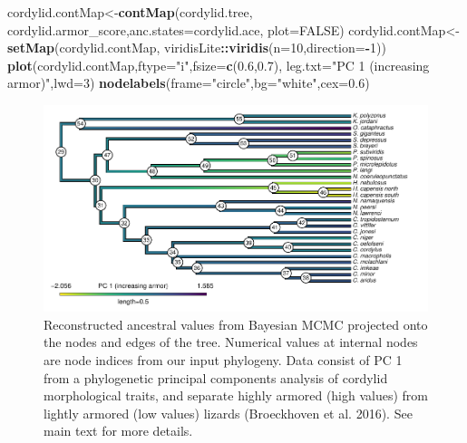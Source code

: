 \documentclass[fleqn,10pt,lineno]{wlpeerj} %
\newenvironment{Shaded}{\begin{snugshade}}{\end{snugshade}}
\newcommand{\AttributeTok}[1]{\textcolor[rgb]{0.13,0.29,0.53}{#1}}
\newcommand{\ConstantTok}[1]{\textcolor[rgb]{0.56,0.35,0.01}{#1}}
\newcommand{\DecValTok}[1]{\textcolor[rgb]{0.00,0.00,0.81}{#1}}
\newcommand{\FloatTok}[1]{\textcolor[rgb]{0.00,0.00,0.81}{#1}}
\newcommand{\FunctionTok}[1]{\textcolor[rgb]{0.13,0.29,0.53}{\textbf{#1}}}
\newcommand{\NormalTok}[1]{#1}
\newcommand{\OtherTok}[1]{\textcolor[rgb]{0.56,0.35,0.01}{#1}}
\newcommand{\SpecialCharTok}[1]{\textcolor[rgb]{0.81,0.36,0.00}{\textbf{#1}}}
\newcommand{\StringTok}[1]{\textcolor[rgb]{0.31,0.60,0.02}{#1}}
\begin{document}
\begin{Shaded}
\begin{Highlighting}[]
\NormalTok{cordylid.contMap}\OtherTok{\textless{}{-}}\FunctionTok{contMap}\NormalTok{(cordylid.tree,}
\NormalTok{  cordylid.armor\_score,}\AttributeTok{anc.states=}\NormalTok{cordylid.ace,}
  \AttributeTok{plot=}\ConstantTok{FALSE}\NormalTok{)}
\NormalTok{cordylid.contMap}\OtherTok{\textless{}{-}}\FunctionTok{setMap}\NormalTok{(cordylid.contMap,}
\NormalTok{  viridisLite}\SpecialCharTok{::}\FunctionTok{viridis}\NormalTok{(}\AttributeTok{n=}\DecValTok{10}\NormalTok{,}\AttributeTok{direction=}\SpecialCharTok{{-}}\DecValTok{1}\NormalTok{))}
\FunctionTok{plot}\NormalTok{(cordylid.contMap,}\AttributeTok{ftype=}\StringTok{"i"}\NormalTok{,}\AttributeTok{fsize=}\FunctionTok{c}\NormalTok{(}\FloatTok{0.6}\NormalTok{,}\FloatTok{0.7}\NormalTok{),}
  \AttributeTok{leg.txt=}\StringTok{"PC 1 (increasing armor)"}\NormalTok{,}\AttributeTok{lwd=}\DecValTok{3}\NormalTok{)}
\FunctionTok{nodelabels}\NormalTok{(}\AttributeTok{frame=}\StringTok{"circle"}\NormalTok{,}\AttributeTok{bg=}\StringTok{"white"}\NormalTok{,}\AttributeTok{cex=}\FloatTok{0.6}\NormalTok{)}
\end{Highlighting}
\end{Shaded}

\begin{figure}
\includegraphics[width=1\linewidth]{Revell.phytools-v2_peerj_files/figure-latex/cordylid-ace-1} \caption{Reconstructed ancestral values from Bayesian MCMC projected onto the nodes and edges of the tree. Numerical values at internal nodes are node indices from our input phylogeny. Data consist of PC 1 from a phylogenetic principal components analysis of cordylid morphological traits, and separate highly armored (high values) from lightly armored (low values) lizards (Broeckhoven et al. 2016). See main text for more details.}\label{fig:cordylid-ace}
\end{figure}
\end{document}
